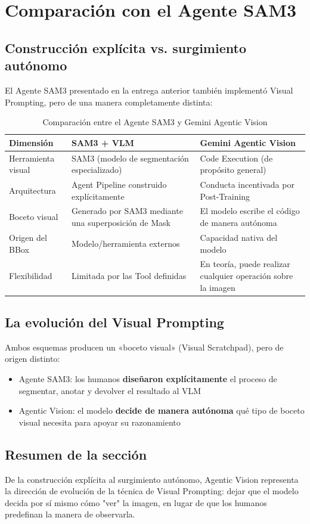 \section{Comparación con el Agente SAM3}

\subsection{Construcción explícita vs. surgimiento autónomo}

El Agente SAM3 presentado en la entrega anterior también implementó Visual Prompting, pero de una manera completamente distinta:

\begin{table}[H]
\centering
\begin{tabular}{p{3cm}p{5cm}p{5cm}}
\toprule
\textbf{Dimensión} & \textbf{SAM3 + VLM} & \textbf{Gemini Agentic Vision} \\
\midrule
Herramienta visual & SAM3 (modelo de segmentación especializado) & Code Execution (de propósito general) \\
Arquitectura & Agent Pipeline construido explícitamente & Conducta incentivada por Post-Training \\
Boceto visual & Generado por SAM3 mediante una superposición de Mask & El modelo escribe el código de manera autónoma \\
Origen del BBox & Modelo/herramienta externos & Capacidad nativa del modelo \\
Flexibilidad & Limitada por las Tool definidas & En teoría, puede realizar cualquier operación sobre la imagen \\
\bottomrule
\end{tabular}
\caption{Comparación entre el Agente SAM3 y Gemini Agentic Vision}
\end{table}

\subsection{La evolución del Visual Prompting}

Ambos esquemas producen un «boceto visual» (Visual Scratchpad), pero de origen distinto:

\begin{itemize}
    \item Agente SAM3: los humanos \textbf{diseñaron explícitamente} el proceso de segmentar, anotar y devolver el resultado al VLM
    \item Agentic Vision: el modelo \textbf{decide de manera autónoma} qué tipo de boceto visual necesita para apoyar su razonamiento
\end{itemize}

\subsection{Resumen de la sección}

De la construcción explícita al surgimiento autónomo, Agentic Vision representa la dirección de evolución de la técnica de Visual Prompting: dejar que el modelo decida por sí mismo cómo "ver" la imagen, en lugar de que los humanos predefinan la manera de observarla.

